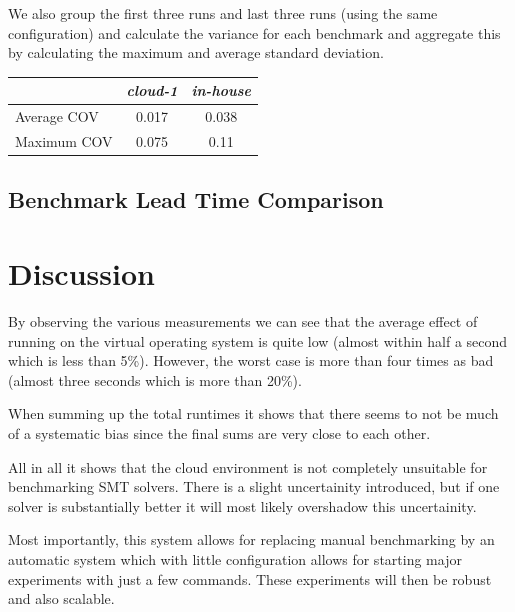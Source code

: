 \documentclass[a4paper]{IEEEtran}
\begin{document}
We also group the first three runs and last three runs (using the same configuration) and calculate the variance for each benchmark and aggregate this by calculating the maximum and average standard deviation.

\begin{Figure}
  \centering
  \begin{tabular}{|l|c|c|}
    \hline
    & \emph{cloud-1} & \emph{in-house} \\
  \hline
  Average COV & 0.017 & 0.038 \\
  \hline
  Maximum COV  & 0.075 & 0.11 \\
  \hline
\end{tabular}
\label{tbl:one}
\end{Figure}


\subsection{Benchmark Lead Time Comparison}

\section{Discussion}
By observing the various measurements we can see that the average
effect of running on the virtual operating system is quite low (almost
within half a second which is less than 5\%). However, the worst case
is more than four times as bad (almost three seconds which is more
than 20\%).

When summing up the total runtimes it shows that there seems to not be
much of a systematic bias since the final sums are very close to each
other.

All in all it shows that the cloud environment is not completely
unsuitable for benchmarking SMT solvers. There is a slight
uncertainity introduced, but if one solver is substantially better it
will most likely overshadow this uncertainity.

Most importantly, this system allows for replacing manual benchmarking
by an automatic system which with little configuration allows for
starting major experiments with just a few commands. These experiments
will then be robust and also scalable. 
\end{document}

